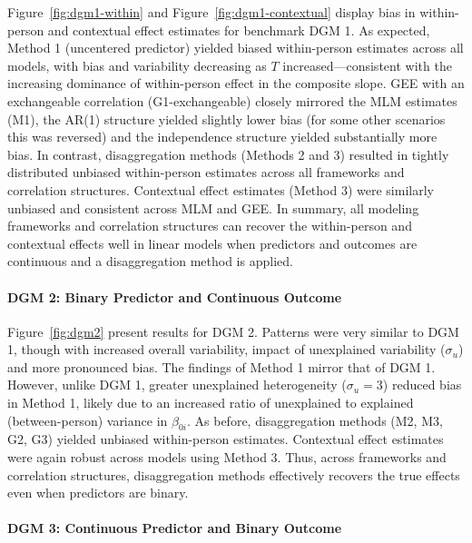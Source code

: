 Figure~\ref{fig:dgm1-within} and Figure~\ref{fig:dgm1-contextual} display bias in within-person and contextual effect estimates for benchmark DGM 1. As expected, Method 1 (uncentered predictor) yielded biased within-person estimates across all models, with bias and variability decreasing as \(T\) increased—consistent with the increasing dominance of within-person effect in the composite slope. GEE with an exchangeable correlation (G1-exchangeable) closely mirrored the MLM estimates (M1), the AR(1) structure yielded slightly lower bias (for some other scenarios this was reversed) and the independence structure yielded substantially more bias. In contrast, disaggregation methods (Methods 2 and 3) resulted in tightly distributed unbiased within-person estimates across all frameworks and correlation structures. Contextual effect estimates (Method 3) were similarly unbiased and consistent across MLM and GEE. In summary, all modeling frameworks and correlation structures can recover the within-person and contextual effects well in linear models when predictors and outcomes are continuous and a disaggregation method is applied.



\paragraph{DGM 2: Binary Predictor and Continuous Outcome}

Figure~\ref{fig:dgm2} present results for DGM 2. Patterns were very similar to DGM 1, though with increased overall variability, impact of unexplained variability ($\sigma_u$) and more pronounced bias. The findings of Method 1 mirror that of DGM 1. However, unlike DGM 1, greater unexplained heterogeneity (\(\sigma_u = 3\)) reduced bias in Method 1, likely due to an increased ratio of unexplained to explained (between-person) variance in $\beta_{0i}$. As before, disaggregation methods (M2, M3, G2, G3) yielded unbiased within-person estimates. Contextual effect estimates were again robust across models using Method 3. Thus, across frameworks and correlation structures, disaggregation methods effectively recovers the true effects even when predictors are binary.



\paragraph{DGM 3: Continuous Predictor and Binary Outcome}

